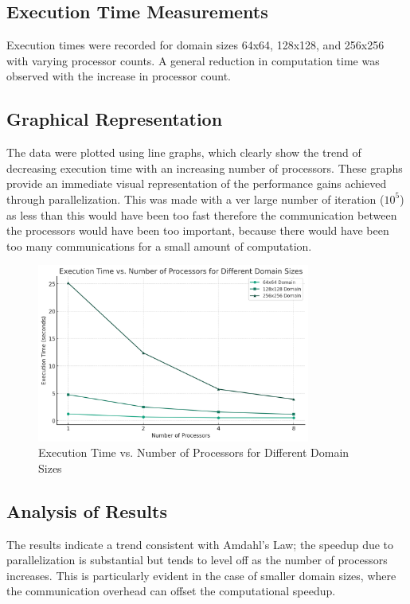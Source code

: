 \documentclass[11pt]{article}
\begin{document}
        \subsection{Execution Time Measurements}
        Execution times were recorded for domain sizes 64x64, 128x128, and 256x256 with varying processor counts. A general reduction in computation time was observed with the increase in processor count.

        \subsection{Graphical Representation}
        The data were plotted using line graphs, which clearly show the trend of decreasing execution time with an increasing number of processors. These graphs provide an immediate visual representation of the performance gains achieved through parallelization. This was made with a ver large number of iteration ($10^5$) as less than this would have been too fast therefore the communication between the processors would have been too important, because there would have been too many communications for a small amount of computation.

    \begin{figure}[ht]
        \centering
        \includegraphics[width=0.8\textwidth]{img/performance.png}
        \caption{Execution Time vs. Number of Processors for Different Domain Sizes}\label{fig:execution_time}
    \end{figure}

        \subsection{Analysis of Results}
        The results indicate a trend consistent with Amdahl's Law; the speedup due to parallelization is substantial but tends to level off as the number of processors increases. This is particularly evident in the case of smaller domain sizes, where the communication overhead can offset the computational speedup.
\end{document}
